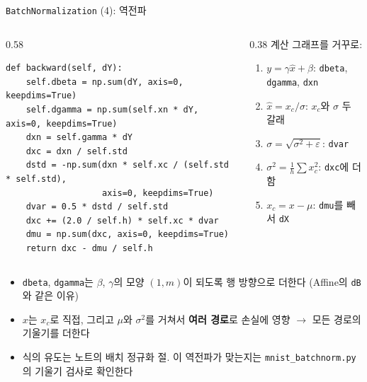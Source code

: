 \documentclass[aspectratio=169,11pt]{beamer}
\newcommand{\codesmall}{\ttfamily\fontsize{7.4}{8.3}\selectfont}
\newcommand{\code}[1]{\texttt{#1}}
\begin{document}
\begin{frame}[fragile]{\code{BatchNormalization} (4): 역전파}
\begin{columns}[T,onlytextwidth]
\begin{column}{0.58\textwidth}
\begin{lstlisting}[basicstyle=\codesmall]
def backward(self, dY):
    self.dbeta = np.sum(dY, axis=0, keepdims=True)
    self.dgamma = np.sum(self.xn * dY, axis=0, keepdims=True)
    dxn = self.gamma * dY
    dxc = dxn / self.std
    dstd = -np.sum(dxn * self.xc / (self.std * self.std),
                   axis=0, keepdims=True)
    dvar = 0.5 * dstd / self.std
    dxc += (2.0 / self.h) * self.xc * dvar
    dmu = np.sum(dxc, axis=0, keepdims=True)
    return dxc - dmu / self.h
\end{lstlisting}
\end{column}
\begin{column}{0.38\textwidth}
\small
계산 그래프를 거꾸로:
\begin{enumerate}
\item $y=\gamma\hat x+\beta$: \code{dbeta}, \code{dgamma}, \code{dxn}
\item $\hat x = x_c/\sigma$: $x_c$와 $\sigma$ 두 갈래
\item $\sigma=\sqrt{\sigma^2+\varepsilon}$: \code{dvar}
\item $\sigma^2=\frac1h\sum x_c^2$: \code{dxc}에 더함
\item $x_c = x-\mu$: \code{dmu}를 빼서 \code{dX}
\end{enumerate}
\end{column}
\end{columns}
\small
\begin{itemize}
\item \code{dbeta}, \code{dgamma}는 $\beta$, $\gamma$의 모양 $(1,m)$이 되도록 행 방향으로 더한다 (Affine의 \code{dB}와 같은 이유)
\item $x$는 $x_c$로 직접, 그리고 $\mu$와 $\sigma^2$를 거쳐서 \textbf{여러 경로}로 손실에 영향 $\to$ 모든 경로의 기울기를 더한다
\item 식의 유도는 노트의 배치 정규화 절. 이 역전파가 맞는지는 \code{mnist\_batchnorm.py}의 기울기 검사로 확인한다
\end{itemize}
\end{frame}
\end{document}
